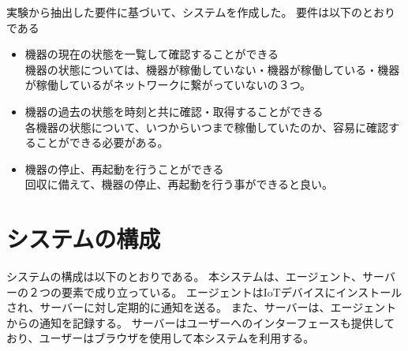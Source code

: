 実験から抽出した要件に基づいて、システムを作成した。
要件は以下のとおりである
\begin{itemize}
	\item 機器の現在の状態を一覧して確認することができる\\
		機器の状態については、機器が稼働していない・機器が稼働している・機器が稼働しているがネットワークに繋がっていないの３つ。
	\item 機器の過去の状態を時刻と共に確認・取得することができる\\
		各機器の状態について、いつからいつまで稼働していたのか、容易に確認することができる必要がある。
	\item 機器の停止、再起動を行うことができる\\
		回収に備えて、機器の停止、再起動を行う事ができると良い。
\end{itemize}

\section{システムの構成}
システムの構成は以下のとおりである。
本システムは、エージェント、サーバーの２つの要素で成り立っている。
エージェントはIoTデバイスにインストールされ、サーバーに対し定期的に通知を送る。
また、サーバーは、エージェントからの通知を記録する。
サーバーはユーザーへのインターフェースも提供しており、ユーザーはブラウザを使用して本システムを利用する。

